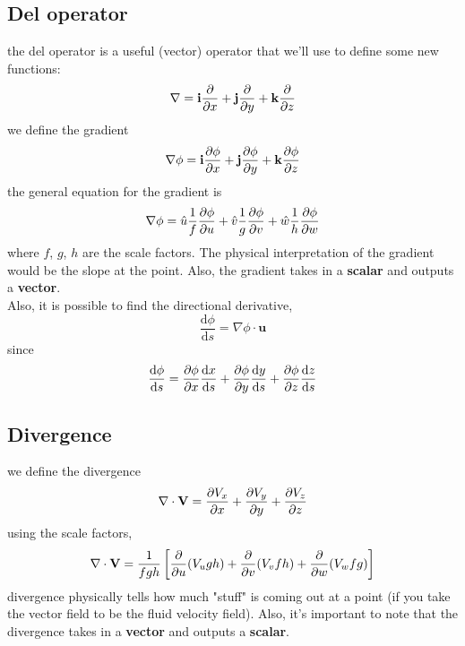 \documentclass[oneside]{book}
\numberwithin{equation}{chapter} %
\newcommand{\ode}[2]{\ensuremath{\frac{\mathrm{d}#1}{\mathrm{d}#2}}}
\newcommand{\pde}[2]{\ensuremath{%
		\frac{\partial #1}{\partial #2}}}
\begin{document}
\subsection{Del operator}
the del operator is a useful (vector) operator that we'll use to define some new functions:
\begin{equation}
	\nabla=\mathbf i\pde{}{x}+\mathbf j \pde{}{y}+\mathbf k\pde{}{z}
\end{equation}
we define the gradient
\begin{equation}
	\nabla\phi=\mathbf i\pde\phi x+\mathbf j\pde \phi y+\mathbf k\pde \phi z
\end{equation}
the general equation for the gradient is 
\begin{equation*}
	\nabla\phi=\hat{ u}\frac 1f\pde\phi u+\hat{ v}\frac 1g\pde \phi v+\hat{w}\frac 1h\pde \phi w
\end{equation*}
where $f$, $g$, $h$ are the scale factors. The physical interpretation of the gradient would be the slope at the point. Also, the gradient takes in a \textbf{scalar} and outputs a \textbf{vector}.\\

Also, it is possible to find the directional derivative, 
\begin{equation}
	\ode \phi s=\nabla\phi\cdot\mathbf u
\end{equation}
since
$$\ode \phi s=\pde \phi x\ode xs+\pde\phi y\ode ys+\pde\phi z\ode zs$$
\subsection{Divergence}
we define the divergence 
\begin{equation}
	\nabla\cdot\mathbf V=\pde{V_x}x+\pde{V_y}y+\pde{V_z}z
\end{equation}
using the scale factors, 
\begin{equation*}
	\nabla\cdot\mathbf V=\frac 1{fgh}\left[\pde{}{u}(V_ugh)+\pde{}{v}(V_vfh)+\pde{}{w}(V_wfg)
	\right]
\end{equation*}
divergence physically tells how much "stuff" is coming out at a point (if you take the vector field to be the fluid velocity field). Also, it's important to note that the divergence takes in a \textbf{vector} and outputs a \textbf{scalar}.
\end{document}
